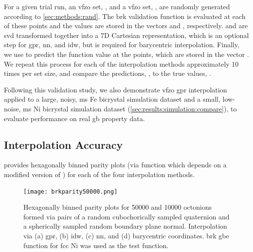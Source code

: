 \documentclass[final,twocolumn,12pt]{elsarticle}
\begin{document}
For a given trial run, an \inpt{} \gls{vfzo} set, , and a \outpt{} \gls{vfzo} set, , are randomly generated according to \cref{sec:methods:rand}. The \gls{brk} validation function is evaluated at each of these points and the values are stored in the vectors  and , respectively.  and  are \gls{svd} transformed together into a 7D Cartesian representation, which is an optional step for \gls{gpr}, \gls{nn}, and \gls{idw}, but is required for barycentric interpolation. Finally, we use  \cite{bairdFiveDegreeofFreedom5DOF2020} to predict the function value at the \outpt{} points, which are stored in the vector . We repeat this process for each of the interpolation methods approximately 10 times per set size, and compare the predictions, , to the true values, .

Following this validation study, we also demonstrate \gls{vfzo} \gls{gpr} interpolation applied to a large, noisy, \gls{ms} Fe bicrystal simulation dataset \cite{kimPhasefieldModeling3D2014} and a small, low-noise, \gls{ms} Ni bicrystal simulation dataset \cite{olmstedSurveyComputedGrain2009} (\cref{sec:results:simulation:compare}), to evaluate performance on real \gls{gb} property data.

\subsection{Interpolation Accuracy}
\label{sec:results:accuracy}

 provides hexagonally binned parity plots (via \vfzorepo{} function  which depends on a modified version of \cite{beanHexscatter2020}) for each of the four interpolation methods.
\begin{figure}[h!]
    \centering
    \texttt{[image: brkparity50000.png]}
    \caption{Hexagonally binned parity plots for \num{50000} \inpt{} and \num{10000} \outpt{} octonions formed via pairs of a random cubochorically sampled quaternion and a spherically sampled random boundary plane normal. Interpolation via (a) \gls{gpr}, (b) \gls{idw}, (c) \gls{nn}, and (d) barycentric coordinates.  \gls{brk} \gls{gbe} function for \gls{fcc} Ni \cite{bulatovGrainBoundaryEnergy2014} was used as the test function.}
    \label{fig:brkparity50000}
\end{figure}
\end{document}
